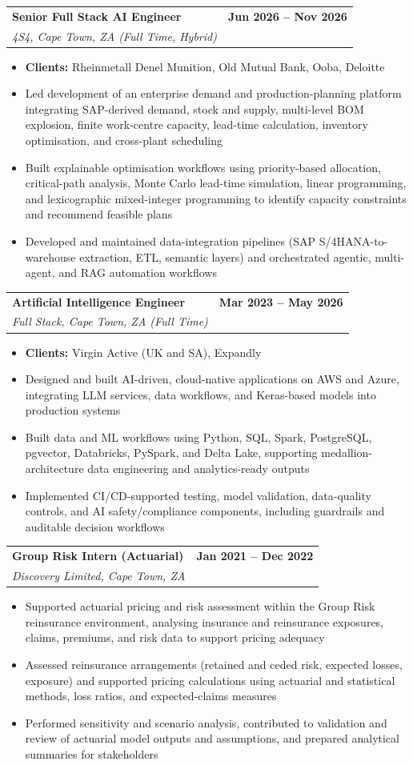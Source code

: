 \documentclass[letterpaper,11pt]{article}
\makeatletter
\newcommand{\resumeItem}[1]{
  \item\small{
    {#1 \vspace{-1pt}}
  }
}
\newcommand{\resumeSubheading}[4]{
  \vspace{-2pt}\item
    \begin{tabular*}{1.0\textwidth}[t]{l@{\extracolsep{\fill}}r}
      \textbf{\large#1} & \textbf{\small #2} \\
      \textit{\large#3} & \textit{\small #4} \\

    \end{tabular*}\vspace{-7pt}
}
\newcommand{\resumeItemListStart}{\begin{itemize}[leftmargin=0.1in]}
\newcommand{\resumeItemListEnd}{\end{itemize}\vspace{-5pt}}
\newcommand{\entryGap}{\vspace{3pt}\needspace{6\baselineskip}}
\makeatother
\begin{document}
    \resumeSubheading
      {Senior Full Stack AI Engineer}{Jun 2026 -- Nov 2026}
      {4S4, Cape Town, ZA (Full Time, Hybrid)}{}
      \resumeItemListStart
            \resumeItem{\normalsize{\textbf{Clients:} Rheinmetall Denel Munition, Old Mutual Bank, Ooba, Deloitte}}
            \resumeItem{\normalsize{Led development of an enterprise demand and production-planning platform integrating SAP-derived demand, stock and supply, multi-level BOM explosion, finite work-centre capacity, lead-time calculation, inventory optimisation, and cross-plant scheduling}}
            \resumeItem{\normalsize{Built explainable optimisation workflows using priority-based allocation, critical-path analysis, Monte Carlo lead-time simulation, linear programming, and lexicographic mixed-integer programming to identify capacity constraints and recommend feasible plans}}
            \resumeItem{\normalsize{Developed and maintained data-integration pipelines (SAP S/4HANA-to-warehouse extraction, ETL, semantic layers) and orchestrated agentic, multi-agent, and RAG automation workflows}}
      \resumeItemListEnd
    \entryGap

    \resumeSubheading
      {Artificial Intelligence Engineer}{Mar 2023 -- May 2026}
      {Full Stack, Cape Town, ZA (Full Time)}{}
      \resumeItemListStart
            \resumeItem{\normalsize{\textbf{Clients:} Virgin Active (UK and SA), Expandly}}
            \resumeItem{\normalsize{Designed and built AI-driven, cloud-native applications on AWS and Azure, integrating LLM services, data workflows, and Keras-based models into production systems}}
            \resumeItem{\normalsize{Built data and ML workflows using Python, SQL, Spark, PostgreSQL, pgvector, Databricks, PySpark, and Delta Lake, supporting medallion-architecture data engineering and analytics-ready outputs}}
            \resumeItem{\normalsize{Implemented CI/CD-supported testing, model validation, data-quality controls, and AI safety/compliance components, including guardrails and auditable decision workflows}}
      \resumeItemListEnd
    \entryGap

    \resumeSubheading
      {Group Risk Intern (Actuarial)}{Jan 2021 -- Dec 2022}
      {Discovery Limited, Cape Town, ZA}{}
      \resumeItemListStart
            \resumeItem{\normalsize{Supported actuarial pricing and risk assessment within the Group Risk reinsurance environment, analysing insurance and reinsurance exposures, claims, premiums, and risk data to support pricing adequacy}}
            \resumeItem{\normalsize{Assessed reinsurance arrangements (retained and ceded risk, expected losses, exposure) and supported pricing calculations using actuarial and statistical methods, loss ratios, and expected-claims measures}}
            \resumeItem{\normalsize{Performed sensitivity and scenario analysis, contributed to validation and review of actuarial model outputs and assumptions, and prepared analytical summaries for stakeholders}}
      \resumeItemListEnd
\end{document}
